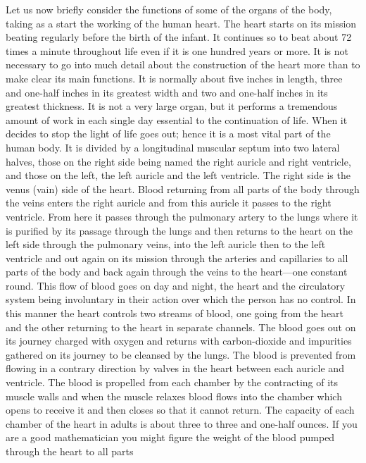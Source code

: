 Let us now briefly consider the functions of some of the organs of the body, taking as a start
the working of the human heart. The heart starts on its mission beating regularly before the
birth of the infant. It continues so to beat about 72 times a minute throughout life even if it is
one hundred years or more. It is not necessary to go into much detail about the construction
of the heart more than to make clear its main functions. It is normally about five inches in
length, three and one-half inches in its greatest width and two and one-half inches in its
greatest thickness. It is not a very large organ, but it performs a tremendous amount of work
in each single day essential to the continuation of life. When it decides to stop the light of life
goes out; hence it is a most vital part of the human body. It is divided by a longitudinal
muscular septum into two lateral halves, those on the right side being named the right auricle
and right ventricle, and those on the left, the left auricle and the left ventricle. The right side
is the venus (vain) side of the heart. Blood returning from all parts of the body through the
veins enters the right auricle and from this auricle it passes to the right ventricle. From here it
passes through the pulmonary artery to the lungs where it is purified by its passage through
the lungs and then returns to the heart on the left side through the pulmonary veins, into the
left auricle then to the left ventricle and out again on its mission through the arteries and
capillaries to all parts of the body and back again through the veins to the heart—one
constant round. This flow of blood goes on day and night, the heart and the circulatory
system being involuntary in their action over which the person has no control. In this manner
the heart controls two streams of blood, one going from the heart and the other returning to
the heart in separate channels. The blood goes out on its journey charged with oxygen and
returns with carbon-dioxide and impurities gathered on its journey to be cleansed by the
lungs. The blood is prevented from flowing in a contrary direction by valves in the heart
between each auricle and ventricle. The blood is propelled from each chamber by the
contracting of its muscle walls and when the muscle relaxes blood flows into the chamber
which opens to receive it and then closes so that it cannot return. The capacity of each
chamber of the heart in adults is about three to three and one-half ounces. If you are a good
mathematician you might figure the weight of the blood pumped through the heart to all parts
